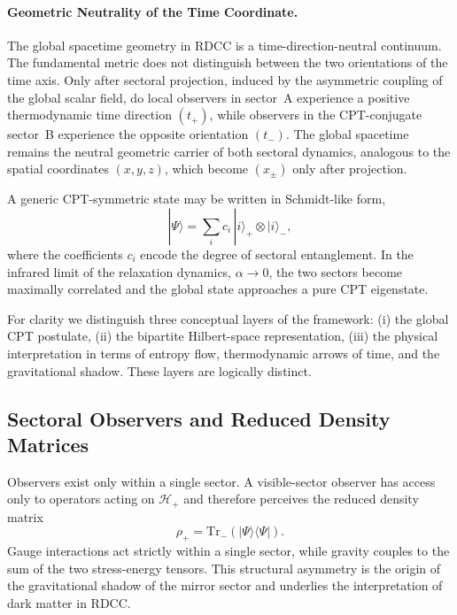 \documentclass[11pt,a4paper]{article}
\begin{document}
\paragraph{Geometric Neutrality of the Time Coordinate.}
The global spacetime geometry in RDCC is a time-direction-neutral continuum.
The fundamental metric does not distinguish between the two orientations of the
time axis. Only after sectoral projection, induced by the asymmetric coupling of
the global scalar field, do local observers in sector~A experience a positive
thermodynamic time direction \((t_{+})\), while observers in the CPT-conjugate
sector~B experience the opposite orientation \((t_{-})\). The global spacetime
remains the neutral geometric carrier of both sectoral dynamics, analogous to the
spatial coordinates \((x,y,z)\), which become \((x_{\pm})\) only after projection.

\vspace{1.5em}

A generic CPT-symmetric state may be written in Schmidt-like form,
\begin{equation}
    |\Psi\rangle = \sum_{i} c_{i}\,|i\rangle_{+} \otimes |i\rangle_{-},
\end{equation}
where the coefficients \(c_{i}\) encode the degree of sectoral entanglement. In
the infrared limit of the relaxation dynamics, \(\alpha \to 0\), the two sectors
become maximally correlated and the global state approaches a pure CPT
eigenstate.

For clarity we distinguish three conceptual layers of the framework:  
(i) the global CPT postulate,  
(ii) the bipartite Hilbert-space representation,  
(iii) the physical interpretation in terms of entropy flow, thermodynamic arrows
of time, and the gravitational shadow. These layers are logically distinct.


\subsection{Sectoral Observers and Reduced Density Matrices}

Observers exist only within a single sector. A visible-sector observer has access
only to operators acting on \(\mathcal{H}_{+}\) and therefore perceives the reduced
density matrix
\begin{equation}
    \rho_{+} = \mathrm{Tr}_{-}\!\left(|\Psi\rangle\langle\Psi|\right).
\end{equation}
Gauge interactions act strictly within a single sector, while gravity couples to
the sum of the two stress-energy tensors. This structural asymmetry is the origin
of the gravitational shadow of the mirror sector and underlies the interpretation
of dark matter in RDCC.
\end{document}
